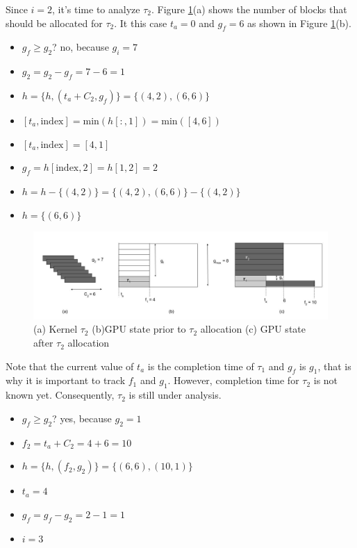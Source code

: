 \documentclass[
  12pt,
  a4paperpaper,
]{report}
\providecommand{\tightlist}{%
  \setlength{\itemsep}{0pt}\setlength{\parskip}{0pt}}
\begin{document}
Since \(i=2\), it's time to analyze \(\tau_2\). Figure \ref{img:ex_2}(a)
shows the number of blocks that should be allocated for \(\tau_2\). It
this case \(t_a = 0\) and \(g_f = 6\) as shown in Figure
\ref{img:ex_2}(b).

\begin{itemize}
\tightlist
\item
  \(g_f \geq g_2\)? no, because \(g_i = 7\)
\item
  \(g_2 = g_2 - g_f = 7-6 = 1\)
\item
  \(h = \{h, (t_a + C_2, g_f)\} = \{ (4,2), (6,6) \}\)
\item
  \([ t_a, \mathrm{index} ] = \mathrm{min}(h[:,1]) = \mathrm{min}([4,6])\)
\item
  \([ t_a, \mathrm{index} ] = [4,1]\)
\item
  \(g_f = h[ \mathrm{index},2] = h[1,2] = 2\)
\item
  \(h = h - \{ (4,2) \} = \{ (4,2), (6,6) \} - \{ (4,2) \}\)
\item
  \(h = \{(6,6)\}\)
\end{itemize}

\begin{figure}
\centering
\includegraphics{source/figures/ex_2.jpg}
\caption{(a) Kernel \(\tau_2\) (b)GPU state prior to \(\tau_2\)
allocation (c) GPU state after \(\tau_2\) allocation \label{img:ex_2}}
\end{figure}

Note that the current value of \(t_a\) is the completion time of \(\tau_1\) and
\(g_f\) is \(g_1\), that is why it is important to
track \(f_1\) and \(g_1\). However, completion time for \(\tau_2\) is
not known yet. Consequently, \(\tau_2\) is still under analysis.

\begin{itemize}
\tightlist
\item
  \(g_f \geq g_2\)? yes, because \(g_2 = 1\)
\item
  \(f_2 = t_a + C_2 = 4 + 6 = 10\)
\item
  \(h = \{h, (f_2, g_2)\} = \{ (6,6),(10,1) \}\)
\item
  \(t_a = 4\)
\item
  \(g_f = g_f - g_2 = 2 - 1 = 1\)
\item
  \(i = 3\)
\end{itemize}
\end{document}
